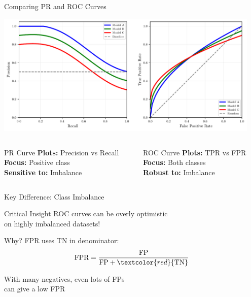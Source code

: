\documentclass{beamer}
\begin{document}
\begin{frame}{Comparing PR and ROC Curves}
\begin{center}
\includegraphics[width=0.95\textwidth]{model-comparison-diagram.pdf}
\end{center}

\vspace{0.2cm}

\begin{columns}
\begin{column}{0.48\textwidth}
\begin{block}{PR Curve}
\textbf{Plots:} Precision vs Recall \\
\textbf{Focus:} Positive class \\
\textbf{Sensitive to:} Imbalance
\end{block}
\end{column}

\begin{column}{0.48\textwidth}
\begin{block}{ROC Curve}
\textbf{Plots:} TPR vs FPR \\
\textbf{Focus:} Both classes \\
\textbf{Robust to:} Imbalance
\end{block}
\end{column}
\end{columns}
\end{frame}

\begin{frame}{Key Difference: Class Imbalance}
\begin{alertblock}{Critical Insight}
\small
ROC curves can be overly optimistic \\
on highly imbalanced datasets!
\end{alertblock}

\vspace{0.15cm}

\begin{examplebox}{Why?}
\small
FPR uses TN in denominator:
$$\text{FPR} = \frac{\text{FP}}{\text{FP} + \textcolor{red}{\text{TN}}}$$

With many negatives, even lots of FPs \\
can give a low FPR
\end{examplebox}
\end{frame}
\end{document}
